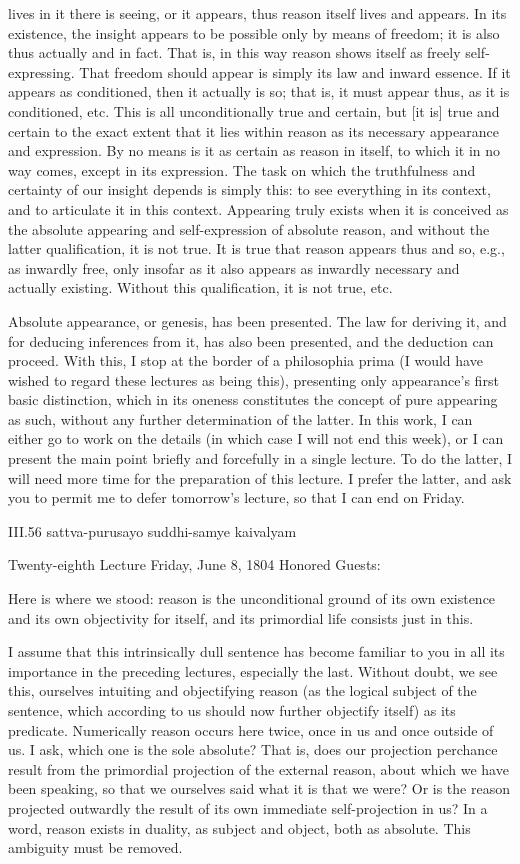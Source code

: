 lives in it there is seeing,
or it appears, thus reason itself lives and appears.
In its existence, the insight appears
to be possible only by means of freedom;
it is also thus actually and in fact.
That is, in this way reason shows itself
as freely self-expressing.
That freedom should appear is
simply its law and inward essence.
If it appears as conditioned, then it actually is so;
that is, it must appear thus, as it is conditioned, etc.
This is all unconditionally true and certain,
but [it is] true and certain to the exact extent
that it lies within reason
as its necessary appearance and expression.
By no means is it as certain as reason in itself,
to which it in no way comes, except in its expression.
The task on which the truthfulness and certainty
of our insight depends is simply this:
to see everything in its context,
and to articulate it in this context.
Appearing truly exists
when it is conceived
as the absolute appearing
and self-expression of absolute reason,
and without the latter qualification,
it is not true.
It is true that reason appears thus and so,
e.g., as inwardly free,
only insofar as it also appears
as inwardly necessary and actually existing.
Without this qualification, it is not true, etc.

Absolute appearance, or genesis,
has been presented.
The law for deriving it,
and for deducing inferences from it,
has also been presented,
and the deduction can proceed.
With this, I stop at the border
of a philosophia prima
(I would have wished to regard
these lectures as being this),
presenting only appearance’s
first basic distinction,
which in its oneness constitutes
the concept of pure appearing as such,
without any further determination of the latter.
In this work, I can either go to work on the details
(in which case I will not end this week),
or I can present the main point
briefly and forcefully
in a single lecture.
To do the latter, I will need more time
for the preparation of this lecture.
I prefer the latter, and ask you to
permit me to defer tomorrow’s lecture,
so that I can end on Friday.

III.56
sattva-purusayo suddhi-samye kaivalyam

Twenty-eighth Lecture
Friday, June 8, 1804
Honored Guests:

Here is where we stood:
reason is the unconditional ground of its own existence
and its own objectivity for itself,
and its primordial life consists just in this.

I assume that this intrinsically dull sentence has
become familiar to you in all its importance
in the preceding lectures, especially the last.
Without doubt, we see this,
ourselves intuiting and objectifying reason
(as the logical subject of the sentence,
which according to us should now
further objectify itself)
as its predicate.
Numerically reason occurs here twice,
once in us and once outside of us.
I ask, which one is the sole absolute?
That is, does our projection perchance result
from the primordial projection of the external reason,
about which we have been speaking,
so that we ourselves said what it is that we were?
Or is the reason projected outwardly the result
of its own immediate self-projection in us?
In a word, reason exists in duality,
as subject and object,
both as absolute.
This ambiguity must be removed.

